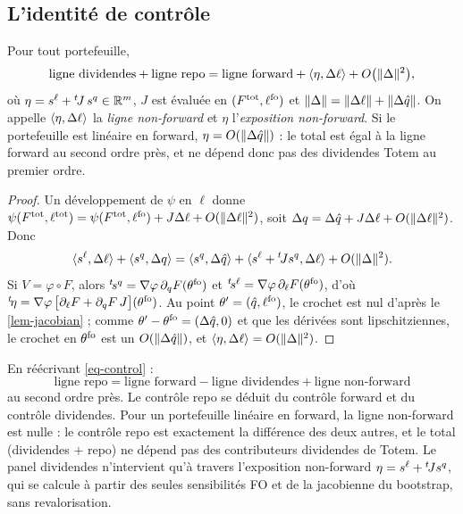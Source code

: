 \subsection{L'identité de contrôle}
\begin{theorem}\label{thm-control}
Pour tout portefeuille,
\begin{equation}\label{eq-control}
\text{ligne dividendes}+\text{ligne repo}=\text{ligne forward}+\langle \eta, \Delta\ell\rangle+O\bigl(\lVert \Delta\rVert^2\bigr),
\end{equation}
où $\eta=s^\ell+{}^{t}\!J\,s^q\in\mathbb{R}^m$, $J$ est évaluée en $(F^{\mathrm{tot}}, \ell^{\mathrm{fo}})$ et $\lVert \Delta\rVert=\lVert \Delta\ell\rVert+\lVert \Delta\hat q\rVert$. On appelle
$\langle \eta, \Delta\ell\rangle$ la \emph{ligne non-forward} et $\eta$ l'\emph{exposition non-forward}. Si le portefeuille
est linéaire en forward, $\eta=O(\lVert \Delta\hat q\rVert)$ : le total est égal à la ligne forward au second ordre près, et
ne dépend donc pas des dividendes Totem au premier ordre.
\end{theorem}
\begin{proof}
Un développement de $\psi$ en $\ell$ donne $\psi(F^{\mathrm{tot}}, \ell^{\mathrm{tot}})=\psi(F^{\mathrm{tot}}, \ell^{\mathrm{fo}})+J\Delta\ell
+O(\lVert \Delta\ell\rVert^2)$, soit $\Delta q=\Delta\hat q+J\Delta\ell+O(\lVert \Delta\ell\rVert^2)$. Donc
\[
\langle s^\ell, \Delta\ell\rangle+\langle s^q, \Delta q\rangle=\langle s^q, \Delta\hat q\rangle+\langle s^\ell+{}^{t}\!Js^q, \Delta\ell\rangle
+O(\lVert \Delta\rVert^2).
\]
Si $V=\varphi\circ F$, alors ${}^{t}\!s^q=\nabla\varphi\,\partial_qF(\theta^{\mathrm{fo}})$ et
${}^{t}\!s^\ell=\nabla\varphi\,\partial_\ell F(\theta^{\mathrm{fo}})$, d'où
${}^{t}\!\eta=\nabla\varphi\,\bigl[\partial_\ell F+\partial_qF\,J\bigr](\theta^{\mathrm{fo}})$. Au point
$\theta'=(\hat q, \ell^{\mathrm{fo}})$, le crochet est nul d'après le \cref{lem-jacobian} ; comme
$\theta'-\theta^{\mathrm{fo}}=(\Delta\hat q, 0)$ et que les dérivées sont lipschitziennes, le crochet en $\theta^{\mathrm{fo}}$ est un
$O(\lVert \Delta\hat q\rVert)$, et $\langle \eta, \Delta\ell\rangle=O(\lVert \Delta\rVert^2)$.
\end{proof}

\begin{reponse}
En réécrivant \eqref{eq-control} :
\[
\boxed{\;\text{ligne repo}=\text{ligne forward}-\text{ligne dividendes}+\text{ligne non-forward}\;}
\]
au second ordre près.
Le contrôle repo se déduit du contrôle forward et du contrôle dividendes. Pour un portefeuille linéaire en forward, la
ligne non-forward est nulle : le contrôle repo est exactement la différence des deux autres, et le total (dividendes
$+$ repo) ne dépend pas des contributeurs dividendes de Totem. Le panel dividendes n'intervient qu'à travers
l'exposition non-forward $\eta=s^\ell+{}^{t}\!Js^q$, qui se calcule à partir des seules sensibilités FO et de la
jacobienne du bootstrap, sans revalorisation.
\end{reponse}


